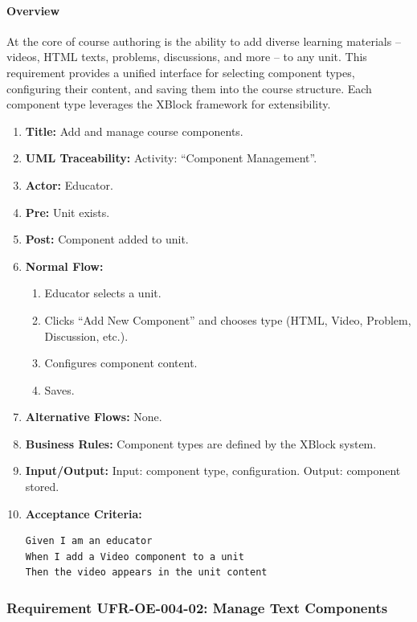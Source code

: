 \paragraph{Overview}
At the core of course authoring is the ability to add diverse learning materials – videos, HTML texts, problems, discussions, and more – to any unit. This requirement provides a unified interface for selecting component types, configuring their content, and saving them into the course structure. Each component type leverages the XBlock framework for extensibility.
\begin{enumerate}[label=\textbf{\arabic*.}]
\item \textbf{Title:} Add and manage course components.
\item \textbf{UML Traceability:} Activity: “Component Management”.
\item \textbf{Actor:} Educator.
\item \textbf{Pre:} Unit exists.
\item \textbf{Post:} Component added to unit.
\item \textbf{Normal Flow:} 
    \begin{enumerate}
        \item Educator selects a unit.
        \item Clicks “Add New Component” and chooses type (HTML, Video, Problem, Discussion, etc.).
        \item Configures component content.
        \item Saves.
    \end{enumerate}
\item \textbf{Alternative Flows:} None.
\item \textbf{Business Rules:} Component types are defined by the XBlock system.
\item \textbf{Input/Output:} Input: component type, configuration. Output: component stored.
\item \textbf{Acceptance Criteria:}
    \begin{verbatim}
Given I am an educator
When I add a Video component to a unit
Then the video appears in the unit content
    \end{verbatim}
\end{enumerate}

\subsubsection{Requirement UFR-OE-004-02: Manage Text Components}
